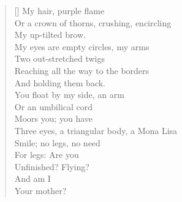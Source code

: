 \settowidth{\versewidth}{Three eyes, a triangular body, a Mona Lisa}
\begin{verse}[\versewidth]
My hair, purple flame\\
Or a crown of thorns, crushing, encircling\\
My up-tilted brow.\\
My eyes are empty circles, my arms\\
Two out-stretched twigs\\
Reaching all the way to the borders\\
And holding them back.\\
You float by my side, an arm\\
Or an umbilical cord\\
Moors you; you have\\
Three eyes, a triangular body, a Mona Lisa\\
Smile; no legs, no need\\
For legs: Are you\\
Unfinished? Flying?\\
And am I\\
Your mother?
\end{verse}
